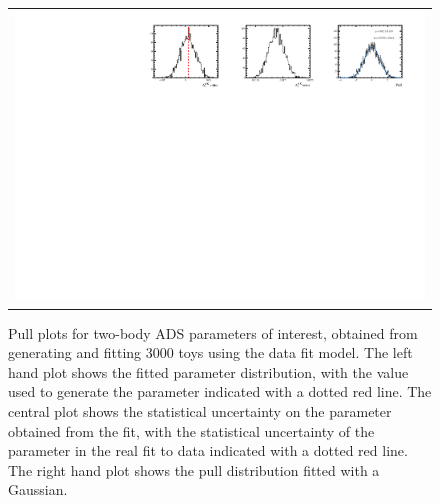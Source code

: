 \begin{figure}
\begin{tabular}{c}
\includegraphics[width=\textwidth]{ANA_resources/Plots/Data_fit/FitterBias//A_Bs_piK.pdf} \\
  \end{tabular}
  \caption{Pull plots for two-body ADS parameters of interest, obtained from generating and fitting 3000 toys using the data fit model. The left hand plot shows the fitted parameter distribution, with the value used to generate the parameter indicated with a dotted red line. The central plot shows the statistical uncertainty on the parameter obtained from the fit, with the statistical uncertainty of the parameter in the real fit to data indicated with a dotted red line. The right hand plot shows the pull distribution fitted with a Gaussian.}
\label{fig:twoBody_ADS_pulls}
\end{figure}
